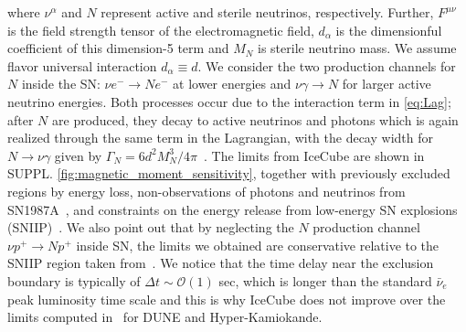 \documentclass[aps,twocolumn,prl,showpacs,showkeys,preprintnumbers,superscriptaddress,nobibnotes,floatfix,longbibliography,notitlepage,nofootinbib]{revtex4-2}
\begin{document}
where $\nu^{\alpha}$ and $N$ represent active and sterile neutrinos, respectively. Further, $F^{\mu\nu}$ is the field strength tensor of the electromagnetic field, $d_\alpha$ is the dimensionful coefficient of this dimension-5 term and $M_N$ is sterile neutrino mass.  We assume flavor universal interaction $d_\alpha \equiv d$. We consider the two production channels for $N$ inside the SN: $\nu e^- \to N e^-$ at lower energies and $\nu \gamma \to N$ for larger active neutrino energies. Both processes occur due to the interaction term in \cref{eq:Lag}; after $N$ are produced, they decay to active neutrinos and photons which is again realized through the same term in the Lagrangian, with the decay width for $N\to\nu\gamma$ given by $\Gamma_N = 6d^2 M_N^3/4 \pi$~\cite{Plestid:2020vqf}. The limits from IceCube are shown in SUPPL. \cref{fig:magnetic_moment_sensitivity}, together with previously excluded regions by energy loss, non-observations of photons and neutrinos from SN1987A~\cite{Brdar:2023tmi}, and constraints on the energy release from low-energy SN explosions (SNIIP)~\cite{PhysRevLett.128.221103, chauhan2024probing}. We also point out that by neglecting the $N$ production channel $\nu p^+\to N p^+$ inside SN, the limits we obtained are conservative relative to the SNIIP region taken from~\cite{chauhan2024probing}. We notice that the time delay near the exclusion boundary is typically of $\Delta t \sim \mathcal{O}(1)$ sec, which is longer than the standard $\bar{\nu}_e$ peak luminosity time scale and this is why IceCube does not improve over the limits computed in~\cite{Brdar:2023tmi} for DUNE and Hyper-Kamiokande. 
\end{document}

